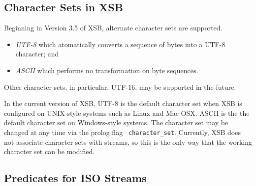 \subsection{Character Sets in XSB}
%
Beginning in Version 3.5 of XSB, alternate character sets are supported.  
%
\begin{itemize}
\item {\em UTF-8} which atomatically converts a sequence of bytes into
  a UTF-8 character; and
%
\item {\em ASCII} which performs no transformation on byte sequences.
\end{itemize}
%
Other character sets, in particular, UTF-16, may be supported in the
future.

In the current version of XSB, UTF-8 is the default character set when
XSB is configured on UNIX-style systems such as Linux and Mac OSX.
ASCII is the the default character set on Windows-style systems.  The
character set may be changed at any time via the prolog flag {\tt
  character\_set}.  Currently, XSB does not associate character sets
with streams, so this is the only way that the working character set
can be modified.

\subsection{Predicates for ISO Streams}


